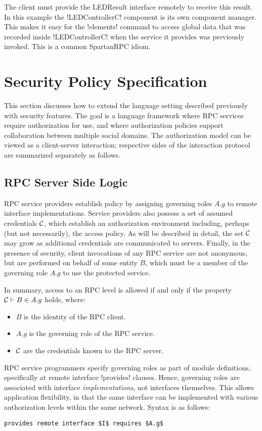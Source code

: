 The client must provide the LEDResult interface remotely to receive this result. In this example
the !LEDControllerC! component is its own component manager. This makes it easy for the
!elements! command to access global data that was recorded inside !LEDControllerC! when the
service it provides was previously invoked. This is a common SpartanRPC idiom.

\section{Security Policy Specification}
\label{section-security-extensions}

This section discusses how to extend the language setting described previously with security
features. The goal is a language framework where RPC services require authorization for use, and
where authorization policies support collaboration between multiple social domains. The
authorization model can be viewed as a client-server interaction; respective sides of the
interaction protocol are summarized separately as follows.

\subsection{RPC Server Side Logic}
\label{section-rpc-server-side}

RPC service providers establish policy by assigning governing roles $A.g$ to remote interface
implementations. Service providers also possess a set of assumed credentials $\mathcal{C}$, which
establish an authorization environment including, perhaps (but not necessarily), the access
policy. As will be described in detail, the set $\mathcal{C}$ may grow as additional credentials are
communicated to servers. Finally, in the presence of security, client invocations of any RPC
service are not anonymous, but are performed on behalf of some entity $B$, which must be a
member of the governing role $A.g$ to use the protected service.

In summary, access to an RPC level is allowed if and only if the property $\mathcal{C} \vdash B \in
A.g$ holds, where:
\begin{itemize}
  \item $B$ is the identity of the RPC client.
  \item $A.g$ is the governing role of the RPC service.
  \item $\mathcal{C}$ are the credentials known to the RPC server.
\end{itemize}
RPC service programmers specify governing roles as part of module definitions, specifically at
remote interface !provides! clauses. Hence, governing roles are associated with interface
\emph{implementations}, not interfaces themselves. This allows application flexibility, in that
the same interface can be implemented with various authorization levels within the same network.
Syntax is as follows:
\begin{lstlisting}[mathescape=true]
provides remote interface $I$ requires $A.g$
\end{lstlisting}

